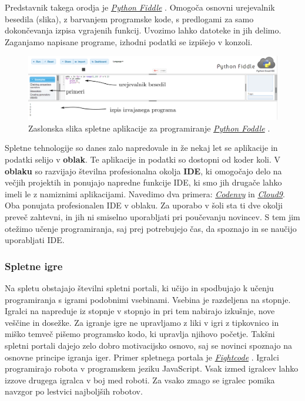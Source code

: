 Predstavnik takega orodja je
\emph{\href{http://pythonfiddle.com/}{Python Fiddle}}
\cite{web:pythonfiddle}. Omogoča osnovni urejevalnik besedila (slika), z
barvanjem programske kode, s predlogami za samo dokončevanja izpisa
vgrajenih funkcij. Uvozimo lahko datoteke in jih delimo. Zaganjamo
napisane programe, izhodni podatki se izpišejo v konzoli.

\begin{figure}[h!]
    \includegraphics [width=1\linewidth, keepaspectratio =
    1] {./images/sc_web/PythonFiddle_01.png}
    \caption{Zaslonska slika spletne aplikacije za programiranje
      \emph{\href{http://pythonfiddle.com/}{Python Foddle}}
      \cite{web:pythonfiddle}.}
    \label{fig:scr:web:PyFiddle}
\end{figure}

Spletne tehnologije so danes zalo napredovale in že nekaj let se
aplikacije in podatki selijo v \textbf{oblak}. Te aplikacije in
podatki so dostopni od koder koli. V \textbf{oblaku} so razvijajo
številna profesionalna okolja \textbf{IDE}, ki omogočajo delo na
večjih projektih in ponujajo napredne funkcije IDE, ki smo jih drugače
lahko imeli le z namiznimi aplikacijami. Navedimo dva primera:
\emph{\href{https://codenvy.com/}{Codenvy}} \cite{web:codeenvy} in
\emph{\href{https://c9.io/}{Cloud9}}\cite{web:cloud9}. Oba ponujata
profesionalen IDE v oblaku. Za uporabo v šoli sta ti dve okolji preveč
zahtevni, in jih ni smiselno uporabljati pri poučevanju novincev. S
tem jim otežimo učenje programiranja, saj prej potrebujejo čas, da
spoznajo in se naučijo uporabljati IDE.

\subsubsection{Spletne igre}
\label{sec:spletne_igre}

Na spletu obstajajo številni spletni portali, ki učijo in spodbujajo k
učenju programiranja s igrami podobnimi vsebinami. Vsebina je
razdeljena na stopnje. Igralci na napreduje iz stopnje v stopnjo in
pri tem nabirajo izkušnje, nove veščine in dosežke. Za igranje igre ne
upravljamo z liki v igri z tipkovnico in miško temveč pišemo
programsko kodo, ki upravlja njihovo početje. Takšni spletni portali
dajejo zelo dobro motivacijsko osnovo, saj se novinci spoznajo na
osnovne principe igranja iger. Primer spletnega portala je
\emph{\href{http://fightcodegame.com/}{Fightcode}}
\cite{web:fightcode}. Igralci programirajo robota v programskem jeziku
JavaScript. Vsak izmed igralcev lahko izzove drugega igralca v boj med
roboti. Za vsako zmago se igralec pomika navzgor po lestvici
najboljših robotov.

